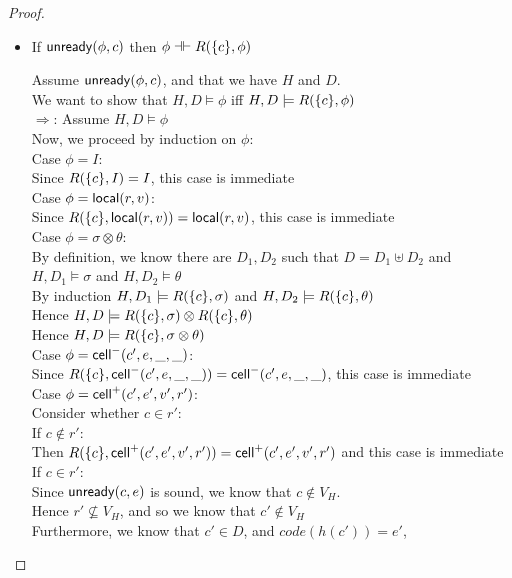 \begin{proof}
\begin{itemize}
\item If $\mathsf{unready}({\phi}, {c})$ then $\phi \dashv\vdash R(\{{c}\}, \phi)$
\begin{tabbedproof}
\oo Assume $\mathsf{unready}({\phi}, {c})$, and that we have $H$ and $D$. \\
\oo We want to show that $H, D \models \phi$ iff $H, D \models R(\{{c}\}, \phi)$ \\
\oo $\Rightarrow$: Assume $H, D \models \phi$ \\
\ooo Now, we proceed by induction on $\phi$: \\
\ooo Case $\phi = I$: \\
\oooo Since $R(\{{c}\}, I) = I$, this case is immediate \\
\ooo Case $\phi = \mathsf{local}({r}, {v})$: \\
\oooo Since $R(\{{c}\}, \mathsf{local}({r}, {v})) = \mathsf{local}({r}, {v})$, this case is immediate \\
\ooo Case $\phi = \sigma \otimes \theta$: \\
\oooo By definition, we know there are $D_1, D_2$ such that $D = D_1 \uplus D_2$ and \\
\ooox $H, D_1 \models \sigma$ and $H, D_2 \models \theta$ \\
\oooo By induction $H, D_1 \models R(\{{c}\}, \sigma)$ and $H, D_2 \models R(\{{c}\}, \theta)$ \\
\oooo Hence $H, D \models R(\{{c}\}, \sigma) \otimes R(\{{c}\}, \theta)$ \\
\oooo Hence $H, D \models R(\{{c}\}, \sigma \otimes \theta)$ \\
\ooo Case $\phi = \mathsf{cell}^{-}({c'}, {e}, {\_}, {\_})$: \\
\oooo Since $R(\{{c}\}, \mathsf{cell}^{-}({c'}, {e}, {\_}, {\_})) = \mathsf{cell}^{-}({c'}, {e}, {\_}, {\_})$, this case is immediate \\
\ooo Case $\phi = \mathsf{cell}^{+}({c'}, {e'}, {v'}, {r'})$: \\
\oooo Consider whether $c \in r'$: \\
\oooo If $c \not\in r'$: \\
\ooooo Then $R(\{{c}\}, \mathsf{cell}^{+}({c'}, {e'}, {v'}, {r'})) = \mathsf{cell}^{+}({c'}, {e'}, {v'}, {r'})$ and this case is immediate \\
\oooo If $c \in r'$: \\
\ooooo Since $\mathsf{unready}({c}, {e})$ is sound, we know that $c \not\in V_H$. \\ 
\ooooo Hence $r' \not\subseteq V_H$, and so we know that $c' \not\in V_H$ \\
\ooooo Furthermore, we know that $c' \in D$, and $\mathit{code}(h(c')) = e'$, \\

\end{tabbedproof}
\end{itemize}
\end{proof}
